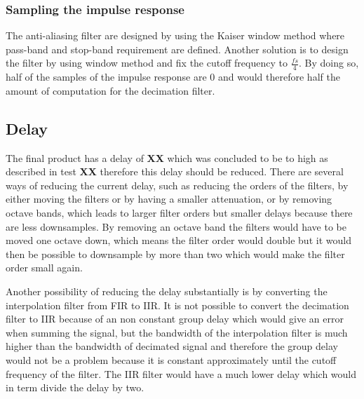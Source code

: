 \subsubsection*{Sampling the impulse response}
The anti-aliasing filter are designed by using the Kaiser window method where pass-band and stop-band requirement are defined. Another solution is to design the filter by using window method and fix the cutoff frequency to $\frac{fs}{4}$. By doing so, half of the samples of the impulse response are 0 and would therefore half the amount of computation for the decimation filter.






\subsection*{Delay}
The final product has a delay of \textbf{XX} which was concluded to be to high as described in test \textbf{XX} therefore this delay should be reduced. There are several ways of reducing the current delay, such as reducing the orders of the filters, by either moving the filters or by having a smaller attenuation, or by removing octave bands, which leads to larger filter orders but smaller delays because there are less downsamples. By removing an octave band the filters would have to be moved one octave down, which means the filter order would double but it would then be possible to downsample by more than two which would make the filter order small again.

Another possibility of reducing the delay substantially is by converting the interpolation filter from FIR to IIR. It is not possible to convert the decimation filter to IIR because of an non constant group delay which would give an error when summing the signal, but the bandwidth of the interpolation filter is much higher than the bandwidth of decimated signal and therefore the group delay would not be a problem because it is constant approximately until the cutoff frequency of the filter. The IIR filter would have a much lower delay which would in term divide the delay by two.   

